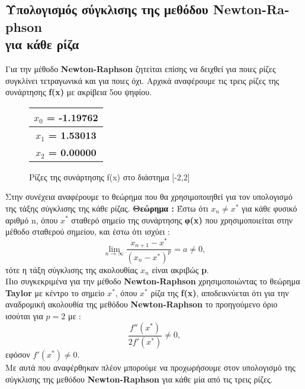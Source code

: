 \documentclass[First Project.tex]{subfiles}
\begin{document}
\subsection{Υπολογισμός σύγκλισης της μεθόδου \textlatin{\textbf{Newton-Raphson}} \\ για κάθε ρίζα}
    Για την μέθοδο \textlatin{\textbf{Newton-Raphson}} ζητείται επίσης να δειχθεί για ποιες ρίζες συγκλίνει τετραγωνικά και για ποιες όχι.
    Αρχικά αναφέρουμε τις τρεις ρίζες της συνάρτησης \textlatin{\textbf{f(x)}} με ακρίβεια 5ου ψηφίου.
    \vspace{10mm}
    \begin{figure}[h!]
        \centering
        \captionsetup{justification=centering}
        \begin{center}
            \begin{tabular}{ |c| }       
                \hline
                \textbf{$x_{0}$ = -1.19762} \\ \hline
                \textbf{$x_{1}$ = 1.53013} \\ \hline
                \textbf{$x_{2}$ = 0.00000} \\ 
                \hline
            \end{tabular}
            \caption{Ρίζες της συνάρτησης \textlatin{f(x)} στο διάστημα [-2,2]}
        \end{center}
    \end{figure}
    Στην συνέχεια αναφέρουμε το θεώρημα που θα χρησιμοποιηθεί για τον υπολογισμό της τάξης σύγκλισης της κάθε ρίζας.
    \large{\textbf{Θεώρημα : }} \normalsize Έστω ότι 
    \( x_{n} \neq x^{*} \)
    για κάθε φυσικό αριθμό \textlatin{n}, όπου $x^{*}$ σταθερό σημείο της συνάρτησης {\textbf{φ(\textlatin{x})}} που χρησιμοποιείται στην μέθοδο σταθερού 
    σημείου, και έστω ότι ισχύει :
    \begin{equation*}
        \lim_{n\to\infty} \frac{x_{n+1} - x^{*}}{(x_{n} - x^{*})^{p}} = a \neq  0 ,     
    \end{equation*}
    τότε η τάξη σύγκλισης της ακολουθίας $x_{n}$ είναι ακριβώς \textlatin{\textbf{p}}. \\ Πιο συγκεκριμένα για την μέθοδο 
    \textlatin{\textbf{Newton-Raphson}} χρησιμοποιώντας το θεώρημα \textlatin{\textbf{Taylor}} με κέντρο το σημείο \textlatin{\textbf{$x^{*}$}},
    όπου \textlatin{\textbf{$x^{*}$}} ρίζα της \textlatin{\textbf{f(x)}}, αποδεικνύεται ότι για την αναδρομική ακολουθία της μεθόδου 
    \textlatin{\textbf{Newton-Raphson}} το προηγούμενο όριο ισούται για \textlatin{\textbf{$p=2$}} με :
    \begin{equation*}
       \frac{f''(x^{*})}{2f'(x^{*})} \neq 0 ,
    \end{equation*}
    εφόσον \( f'(x^{*}) \neq 0\). \\
    Με αυτά που αναφέρθηκαν πλέον μπορούμε να προχωρήσουμε στον υπολογισμό της σύγκλισης της μεθόδου \textlatin{\textbf{Newton-Raphson}} για
    κάθε μία από τις τρεις ρίζες. \\ 
    
\end{document}

